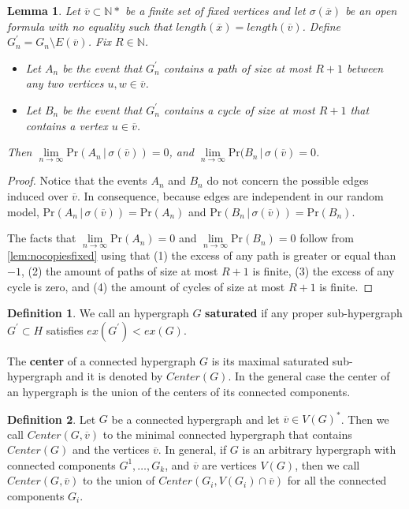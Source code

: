 \documentclass[12pt,notitlepage,a4paper]{article}
\newtheorem{lemma}{Lemma}[section]
\theoremstyle{definition}
\newtheorem{definition}{Definition}[section]
\newcommand{\N}{\mathbb{N}}
\newcommand{\Ln}{\lim\limits_{n\to \infty}}
\begin{document}
\begin{lemma}
	Let $\overline{v} \subset \N*$ be a finite set of fixed vertices and let 
	$\sigma(\overline{x})$ be an open formula with no equality such that
	$length(\overline{x})=length(\overline{v})$. 
	Define $G_n^\prime=G_n \setminus E(\overline{v})$. Fix $R\in \N$. 
	\begin{itemize}
		\item Let $A_n$ be the event that $G^\prime_n$ contains a path of size
		at most	$R+1$ between any two vertices $u,w\in \overline{v}$.
		\item Let $B_n$ be the event
		that $G^\prime_n$ contains a cycle of size at most $R+1$ 
		that contains a vertex $u\in \overline{v}$.
	\end{itemize}
	Then $\Ln \mathrm{Pr}(A_n \, | \, \sigma(\overline{v}))=0$, and 
	$\Ln \mathrm{Pr}(B_n \, | \, \sigma(\overline{v})=0$. 
\end{lemma}
\begin{proof}
	Notice that the events $A_n$ and $B_n$ do not concern the possible edges
	induced over $\overline{v}$. In consequence, because edges are independent
	in our random model, 
	$\mathrm{Pr}(A_n \, | \, \sigma(\overline{v}))
	=\mathrm{Pr}(A_n)$ and 
	$\mathrm{Pr}(B_n \, | \, \sigma(\overline{v}))
	=\mathrm{Pr}(B_n)$.\par
	The facts that $\Ln \mathrm{Pr}(A_n)=0$ and 
	$\Ln \mathrm{Pr}(B_n)=0$ follow
	from \cref{lem:nocopiesfixed} using that 
	(1) the excess of any path is greater or equal than $-1$,
	(2) the amount of paths of size at most $R+1$ is finite,
	(3) the excess of any cycle is zero, and (4) the
	amount of cycles of size at most $R+1$ is finite. 
\end{proof}

\begin{definition}
	We call an hypergraph $G$ \textbf{saturated} if any proper 
	sub-hypergraph $G^\prime \subset H$ satisfies $ex(G^\prime)<ex(G)$. \par
	The \textbf{center} of a connected hypergraph $G$ is its maximal saturated
	sub-hypergraph and it is denoted by $Center(G)$. In the general case 
	the center of an hypergraph is the union of the
	centers of its connected components. 
\end{definition}

\begin{definition}
	Let $G$ be a connected hypergraph and let $\overline{v}\in V(G)^*$.
	Then we call $Center(G, \overline{v})$ to the minimal connected hypergraph
	that contains $Center(G)$ and the vertices $\overline{v}$. In general, if 
	$G$ is an arbitrary hypergraph with connected components $G^1, \dots, G_k$,
	and $\overline{v}$ are vertices $V(G)$, then we call 
	$Center(G, \overline{v})$ to the union of $Center(G_i, V(G_i)\cap
	\overline{v})$ for all the connected components $G_i$.
\end{definition}
\end{document}
